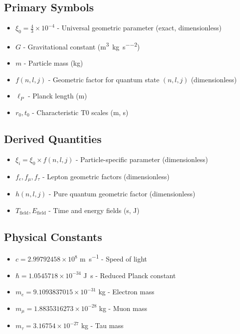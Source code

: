 \documentclass[12pt,a4paper]{article}
\newcommand{\xifunc}{f(n,l,j)}
\theoremstyle{definition}
\begin{document}
	\subsection{Primary Symbols}
	\begin{itemize}
		\item $\xi_0 = \frac{4}{3} \times 10^{-4}$ - Universal geometric parameter (exact, dimensionless)
		\item $G$ - Gravitational constant (\si{\metre\cubed\per\kilogram\per\second\squared})
		\item $m$ - Particle mass (\si{\kilogram})
		\item $\xifunc$ - Geometric factor for quantum state $(n,l,j)$ (dimensionless)
		\item $\ell_P$ - Planck length (\si{\metre})
		\item $r_0, t_0$ - Characteristic T0 scales (\si{\metre}, \si{\second})
	\end{itemize}
	
	\subsection{Derived Quantities}
	\begin{itemize}
		\item $\xi_i = \xi_0 \times \xifunc$ - Particle-specific parameter (dimensionless)
		\item $f_e, f_\mu, f_\tau$ - Lepton geometric factors (dimensionless)
		\item $h(n,l,j)$ - Pure quantum geometric factor (dimensionless)
		\item $T_{\text{field}}, E_{\text{field}}$ - Time and energy fields (\si{\second}, \si{\joule})
	\end{itemize}
	
	\subsection{Physical Constants}
	\begin{itemize}
		\item $c = 2.99792458 \times 10^8$ \si{\metre\per\second} - Speed of light
		\item $\hbar = 1.0545718 \times 10^{-34}$ \si{\joule\second} - Reduced Planck constant
		\item $m_e = 9.1093837015 \times 10^{-31}$ \si{\kilogram} - Electron mass
		\item $m_\mu = 1.8835316273 \times 10^{-28}$ \si{\kilogram} - Muon mass
		\item $m_\tau = 3.16754 \times 10^{-27}$ \si{\kilogram} - Tau mass
	\end{itemize}
	
\end{document}
